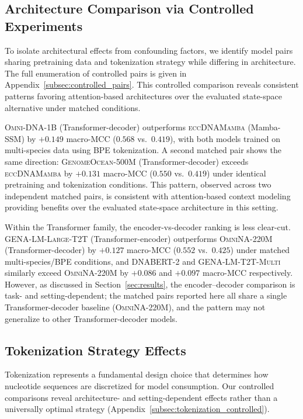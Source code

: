 \documentclass{article}
\theoremstyle{plain}
\theoremstyle{definition}
\theoremstyle{remark}
\begin{document}

\subsection{Architecture Comparison via Controlled Experiments}
\label{subsec:architecture}

To isolate architectural effects from confounding factors, we identify
model pairs sharing pretraining data and tokenization strategy while
differing in architecture. The full enumeration of controlled pairs
is given in Appendix~\ref{subsec:controlled_pairs}. This controlled
comparison reveals consistent patterns favoring attention-based
architectures over the evaluated state-space alternative under matched
conditions.

\textsc{Omni-DNA-1B} (Transformer-decoder) outperforms
\textsc{eccDNAMamba} (Mamba-SSM) by $+0.149$ macro-MCC
($0.568$ vs.\ $0.419$), with both models trained on multi-species
data using BPE tokenization. A second matched pair shows the same
direction: \textsc{GenomeOcean-500M} (Transformer-decoder) exceeds
\textsc{eccDNAMamba} by $+0.131$ macro-MCC ($0.550$ vs.\ $0.419$)
under identical pretraining and tokenization conditions. This pattern,
observed across two independent matched pairs, is consistent with
attention-based context modeling providing benefits over the evaluated
state-space architecture in this setting.

Within the Transformer family, the encoder-vs-decoder ranking is less
clear-cut. \textsc{GENA-LM-Large-T2T} (Transformer-encoder) outperforms
\textsc{OmniNA-220M} (Transformer-decoder) by $+0.127$ macro-MCC
($0.552$ vs.\ $0.425$) under matched multi-species/BPE conditions, and
\textsc{DNABERT-2} and \textsc{GENA-LM-T2T-Multi} similarly exceed
\textsc{OmniNA-220M} by $+0.086$ and $+0.097$ macro-MCC respectively.
However, as discussed in Section~\ref{sec:results}, the encoder--decoder
comparison is task- and setting-dependent; the matched pairs reported
here all share a single Transformer-decoder baseline
(\textsc{OmniNA-220M}), and the pattern may not generalize to other
Transformer-decoder models.

\subsection{Tokenization Strategy Effects}
\label{subsec:tokenization-app}

Tokenization represents a fundamental design choice that determines
how nucleotide sequences are discretized for model consumption. Our
controlled comparisons reveal architecture- and setting-dependent
effects rather than a universally optimal strategy
(Appendix~\ref{subsec:tokenization_controlled}).
\end{document}
